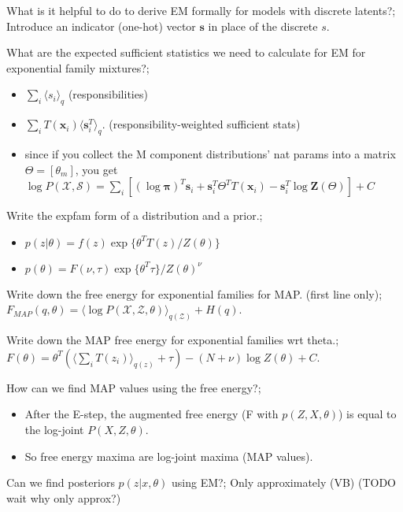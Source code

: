 \documentclass{article}
\begin{document}
What is it helpful to do to derive EM formally for models with discrete latents?; Introduce an indicator (one-hot) vector $\mathbf{s}$ in place of the discrete $s$.

What are the expected sufficient statistics we need to calculate for EM for exponential family mixtures?; \begin{itemize} \item $\sum_i \langle s_i \rangle_{q}$ (responsibilities) \item $\sum_i T(\mathbf{x}_i)\langle \mathbf{s}_i^T \rangle_q$. (responsibility-weighted sufficient stats) \item since if you collect the M component distributions' nat params into a matrix $\Theta=[\theta_m]$, you get $\log P(\mathcal{X, S})=\sum_i [(\log \mathbf{\pi})^T\mathbf{s}_i + \mathbf{s}_i^T\Theta^T T(\mathbf{x}_i) - \mathbf{s}_i^T\log \mathbf{Z}(\Theta)]+C$ \end{itemize}


Write the expfam form of a distribution and a prior.; \begin{itemize} \item $p(z|\theta) = f(z)\exp\{\theta^T T(z)/Z(\theta)\}$ \item $p(\theta) = F(\nu, \tau)\exp\{\theta^T\tau\}/Z(\theta)^\nu$ \end{itemize}

Write down the free energy for exponential families for MAP. (first line only);  $F_{MAP}(q,\theta) = \langle \log P(\mathcal{X, Z, \theta})\rangle_{q(\mathcal{Z})}+H(q)$.

Write down the MAP free energy for exponential families wrt theta.;  $F(\theta) = \theta^T(\langle \sum_i T(z_i) \rangle_{q(z)} + \tau)- (N+\nu) \log Z(\theta) + C$.

How can we find MAP values using the free energy?; \begin{itemize} \item After the E-step, the augmented free energy (F with $p(Z, X, \theta)$) is equal to the log-joint $P(X, Z, \theta)$.  \item So free energy maxima are log-joint maxima (MAP values).  \end{itemize}

Can we find posteriors $p(z|x, \theta)$ using EM?; Only approximately (VB) (TODO wait why only approx?)
\end{document}
